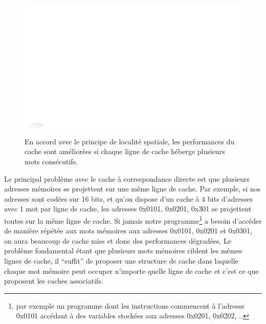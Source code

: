 \begin{figure}[htbp]
\includegraphics[width=\linewidth]{Figs/direct_cache_block.pdf}
\caption{\label{fig:cache_direct_block} En accord avec le principe de localité spatiale, les performances du cache sont améliorées si chaque ligne de cache héberge plusieurs mots consécutifs. }
\end{figure}

Le principal problème avec le cache à correspondance directe est que plusieurs adresses mémoires se projettent sur une même ligne de cache. Par exemple, si nos adresses sont codées sur 16 bits, et qu'on dispose d'un cache à $4$ bits d'adresses avec 1 mot par ligne de cache, les adresses 0x0101, 0x0201, 0x301 se projettent toutes sur la même ligne de cache. Si jamais notre programme\footnote{par exemple un programme dont les instructions commencent à l'adresse 0x0101 accédant à des variables stockées aux adresses 0x0201, 0x0202, ..} a besoin d'accéder de manière répétée aux mots mémoires aux adresses 0x0101, 0x0201 et 0x0301, on aura beaucoup de cache miss et donc des performances dégradées. Le problème fondamental étant que plusieurs mots mémoires ciblent les mêmes lignes de cache, il ``suffit'' de proposer une structure de cache dans laquelle chaque mot mémoire peut occuper n'importe quelle ligne de cache et c'est ce que proposent les caches associatifs.




